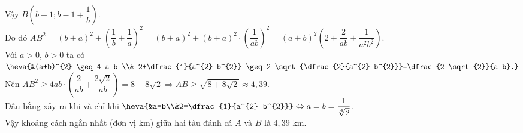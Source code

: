 \begin{bt}
{		 Vậy $B\left(b-1; b-1+\dfrac{1}{b}\right)$.\\
		Do  đó $AB^{2}=(b+a)^{2}+\left(\dfrac{1}{b}+\dfrac{1}{a}\right)^{2}=(b+a)^{2}+(b+a)^{2} \cdot\left(\dfrac{1}{a b}\right)^{2}=(a+b)^{2}\left(2+\dfrac{2}{a b}+\dfrac{1}{a^{2} b^{2}}\right)
		$.\\ 
		Với $ a>0$, $b>0 $ ta  có $\heva{&(a+b)^{2} \geq 4 a b \\& 2+\dfrac{1}{a^{2} b^{2}} \geq 2 \sqrt{\dfrac{2}{a^{2} b^{2}}}=\dfrac{2 \sqrt{2}}{a b}.}$\\
		Nên $ A B^{2} \geq 4 a b  \cdot\left(\dfrac{2}{a b}+\dfrac{2 \sqrt{2}}{a b}\right)=8+8 \sqrt{2} \Rightarrow A B \geq \sqrt{8+8 \sqrt{2}} \approx 4{,}39 $.\\
		Dấu bằng xảy ra khi  và chỉ khi $\heva{&a=b\\&2=\dfrac{1}{a^{2} b^{2}}}\Leftrightarrow a=b=\dfrac{1}{\sqrt[4]{2}}$.\\
		Vậy khoảng cách ngắn nhất (đơn  vị km) giữa hai tàu đánh cá $ A $ và $ B $ là $ 4{,}39$ km.
	 }
\end{bt}

